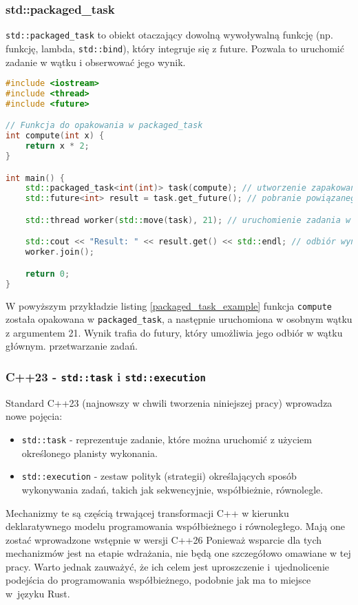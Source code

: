 \subsubsection{std::packaged\_task}
\texttt{std::packaged\_task} to obiekt otaczający dowolną wywoływalną funkcję (np. funkcję, lambda, \texttt{std::bind}), który integruje się z future. Pozwala to uruchomić zadanie w wątku i obserwować jego wynik.
\begin{lstlisting}[language=C++, caption={Przykład użycia std::packaged\_task}, label={packaged_task_example}]
#include <iostream>
#include <thread>
#include <future>

// Funkcja do opakowania w packaged_task
int compute(int x) {
    return x * 2;
}

int main() {
    std::packaged_task<int(int)> task(compute); // utworzenie zapakowanego zadania
    std::future<int> result = task.get_future(); // pobranie powiązanego future

    std::thread worker(std::move(task), 21); // uruchomienie zadania w wątku z parametrem 21

    std::cout << "Result: " << result.get() << std::endl; // odbiór wyniku
    worker.join();

    return 0;
}
\end{lstlisting}
W powyższym przykładzie listing \ref{packaged_task_example} funkcja \texttt{compute} została opakowana w \texttt{packaged\_task}, a następnie uruchomiona w osobnym wątku z argumentem 21. Wynik trafia do futury, który umożliwia jego odbiór w wątku głównym. przetwarzanie zadań.

\subsubsection{C++23 - \texttt{std::task} i \texttt{std::execution}}
Standard C++23 (najnowszy w chwili tworzenia niniejszej pracy) wprowadza nowe pojęcia:
\begin{itemize}
    \item \texttt{std::task} - reprezentuje zadanie, które można uruchomić z użyciem określonego planisty wykonania.
    \item \texttt{std::execution} - zestaw polityk (strategii) określających sposób wykonywania zadań, takich jak sekwencyjnie, współbieżnie, równolegle.
\end{itemize}

Mechanizmy te są częścią trwającej transformacji C++ w kierunku deklaratywnego modelu programowania współbieżnego i równoległego. Mają one zostać wprowadzone wstępnie w wersji C++26 \cite{cpp26} Ponieważ wsparcie dla tych mechanizmów jest na etapie wdrażania, nie będą one szczegółowo omawiane w tej pracy. Warto jednak zauważyć, że ich celem jest uproszczenie i~ujednolicenie podejścia do programowania współbieżnego, podobnie jak ma to miejsce w~języku Rust.